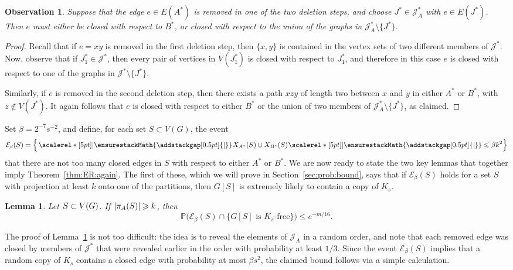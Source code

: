 \documentclass[12pt,reqno]{amsart}
\newcommand\pig[1]{\scalerel*[5pt]{\normalsize#1}{%
  \ensurestackMath{\addstackgap[0.5pt]{\normalsize#1}}}}
\newcommand\pigl[1]{\hspace{0.05cm}\mathopen{\pig{#1}}\hspace{0.03cm}}
\newtheorem{lemma}[theorem]{Lemma}
\newtheorem{observation}[theorem]{Observation}
\theoremstyle{remark}
\numberwithin{theorem}{section}
\renewcommand{\(}{\bigl(}
\renewcommand{\)}{\bigr)\vphantom{)}}
\newcommand{\cE}{\mathcal E}
\newcommand{\cJ}{\mathcal J}
\renewcommand{\le}{\leqslant}
\renewcommand{\ge}{\geqslant}
\renewcommand{\Pr}{\mathbb{P}}
\begin{document}
\begin{observation}
Suppose that the edge $e \in E(A^*)$ is removed in one of the two deletion steps, and choose $J^* \in \cJ^*_A$ with $e \in E(J^*)$. Then $e$ must either be closed with respect to $B^*$, or closed with respect to the union of the graphs in $\cJ^*_A \setminus \{ J^* \}$.
\end{observation}

\begin{proof}
Recall that if $e = xy$ is removed in the first deletion step, then $\{x,y\}$ is contained in the vertex sets of two different members of $\cJ^*$. Now, observe that if $J_1^* \in \cJ^*$, then every pair of vertices in $V(J_1^*)$ is closed with respect to $J_1^*$, and therefore in this case $e$ is closed with respect to one of the graphs in $\cJ^* \setminus \{ J^* \}$.

Similarly, if $e$ is removed in the second deletion step, then there exists a path $xzy$ of length two between $x$ and $y$ in either $A^*$ or $B^*$, with  $z \not\in V(J^*)$. It again follows that $e$ is closed with respect to either $B^*$ or the union of two members of $\cJ^*_A \setminus \{ J^* \}$, as claimed.
\end{proof}

Set $\beta = 2^{-7} s^{-2}$, and define, for each set $S \subset V(G)$, the event 
$$\cE_\beta(S) = \Big\{ \pigl| X_{A^*}(S) \cup X_{B^*}(S) \hspace{0.02cm} \pig| \le \beta k^2 \Big\}$$
that there are not too many closed edges in $S$ with respect to either $A^*$ or $B^*$. We are now ready to state the two key lemmas that together imply Theorem~\ref{thm:ER:again}. The first of these, which we will prove in Section~\ref{sec:prob:bound}, says that if $\cE_\beta(S)$ holds for a set $S$ with projection at least $k$ onto one of the partitions, then $G[S]$ is extremely likely to contain a copy of $K_s$. 

\begin{lemma}\label{lem:ind-set-calc}
Let $\hspace{0.02cm} S \subset V(G)$. If $\hspace{0.03cm} |\pi_A(S)| \ge k$, then 
$$\Pr\Big( \cE_\beta(S) \cap \big\{ G[S] \text{ is $K_s$-free} \big\} \Big) \le e^{-m/16}.$$
\end{lemma}

The proof of Lemma~\ref{lem:ind-set-calc} is not too difficult: the idea is to reveal the elements of $\cJ_A$ in a random order, and note that each removed edge was closed by members of $\cJ^*$ that were revealed earlier in the order with probability at least $1/3$. Since the event $\cE_\beta(S)$ implies that a random copy of $K_s$ contains a closed edge with probability at most $\beta s^2$, the claimed bound follows via a simple calculation.
\end{document}
